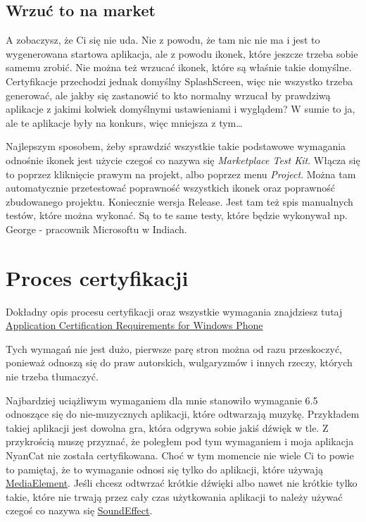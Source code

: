 \documentclass[12pt, a4paper]{article}
\begin{document}
\subsection{Wrzuć to na market}
A zobaczysz, że Ci się nie uda. Nie z powodu, że tam nic nie ma i jest to
wygenerowana startowa aplikacja, ale z powodu ikonek, które jeszcze trzeba sobie
samemu zrobić. Nie można też wrzucać ikonek, które są właśnie takie domyślne.
Certyfikacje przechodzi jednak domyślny SplashScreen, więc nie wszystko trzeba
generować, ale jakby się zastanowić to kto normalny wrzucał by prawdziwą
aplikacje z jakimi kolwiek domyślnymi ustawieniami i wyglądem? W sumie to ja,
ale te aplikacje były na konkurs, więc mniejsza z tym\ldots

Najlepszym sposobem, żeby sprawdzić wszystkie takie podstawowe wymagania
odnośnie ikonek jest użycie czegoś co nazywa się \emph{Marketplace Test Kit}.
Włącza się to poprzez kliknięcie prawym na projekt, albo poprzez menu
\emph{Project}. Można tam automatycznie przetestować poprawność wszystkich
ikonek oraz poprawność zbudowanego projektu. Koniecznie wersja Release. Jest tam
też spis manualnych testów, które można wykonać. Są to te same testy, które
będzie wykonywał np. George - pracownik Microsoftu w Indiach.

\section{Proces certyfikacji}
Dokładny opis procesu certyfikacji oraz wszystkie wymagania znajdziesz tutaj
\href{http://msdn.microsoft.com/en-us/library/hh184843%28v=vs.92%29}{Application
 Certification Requirements for Windows Phone}
 
 Tych wymagań nie jest dużo, pierwsze parę stron można od razu przeskoczyć,
 ponieważ odnoszą się do praw autorskich, wulgaryzmów i innych rzeczy, których
 nie trzeba tłumaczyć.
 
 Najbardziej uciążliwym wymaganiem dla mnie stanowiło wymaganie 6.5 odnoszące
 się do nie-muzycznych aplikacji, które odtwarzają muzykę. Przykładem takiej
 aplikacji jest dowolna gra, która odgrywa sobie jakiś dźwięk w tle. Z
 przykrością muszę przyznać, że poległem pod tym wymaganiem i moja aplikacja
 NyanCat nie została certyfikowana. Choć w tym momencie nie wiele Ci to powie to
 pamiętaj, że to wymaganie odnosi się tylko do aplikacji, które używają
 \href{http://msdn.microsoft.com/en-us/library/system.windows.controls.mediaelement.aspx}{MediaElement}.
 Jeśli chcesz odtwrzać krótkie dźwięki albo nawet nie krótkie tylko takie, które nie trwają przez cały czas użytkowania aplikacji to
 należy używać czegoś co nazywa się
 \href{http://msdn.microsoft.com/en-us/library/microsoft.xna.framework.audio.soundeffect.aspx}{SoundEffect}.
 
\end{document}
